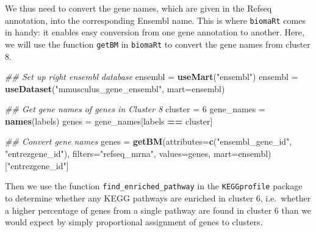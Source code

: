 \documentclass[9pt,a4paper,]{extarticle}
\newenvironment{Shaded}{\begin{snugshade}}{\end{snugshade}}
\newcommand{\CommentTok}[1]{\textcolor[rgb]{0.56,0.35,0.01}{\textit{#1}}}
\newcommand{\DataTypeTok}[1]{\textcolor[rgb]{0.13,0.29,0.53}{#1}}
\newcommand{\DecValTok}[1]{\textcolor[rgb]{0.00,0.00,0.81}{#1}}
\newcommand{\KeywordTok}[1]{\textcolor[rgb]{0.13,0.29,0.53}{\textbf{#1}}}
\newcommand{\NormalTok}[1]{#1}
\newcommand{\OperatorTok}[1]{\textcolor[rgb]{0.81,0.36,0.00}{\textbf{#1}}}
\newcommand{\OtherTok}[1]{\textcolor[rgb]{0.56,0.35,0.01}{#1}}
\newcommand{\StringTok}[1]{\textcolor[rgb]{0.31,0.60,0.02}{#1}}
\begin{document}
We thus need to convert the gene names, which are given in the Refseq
annotation, into the corresponding Ensembl name. This is where \texttt{biomaRt} comes
in handy: it enables easy conversion from one gene annotation to another.
Here, we will use the function \texttt{getBM} in \texttt{biomaRt} to convert the gene names
from cluster 8.

\begin{Shaded}
\begin{Highlighting}[]
\CommentTok{## Set up right ensembl database}
\NormalTok{ensembl =}\StringTok{ }\KeywordTok{useMart}\NormalTok{(}\StringTok{"ensembl"}\NormalTok{)}
\NormalTok{ensembl =}\StringTok{ }\KeywordTok{useDataset}\NormalTok{(}\StringTok{"mmusculus_gene_ensembl"}\NormalTok{, }\DataTypeTok{mart=}\NormalTok{ensembl)}

\CommentTok{## Get gene names of genes in Cluster 8}
\NormalTok{cluster =}\StringTok{ }\DecValTok{6}
\NormalTok{gene_names =}\StringTok{ }\KeywordTok{names}\NormalTok{(labels)}
\NormalTok{genes =}\StringTok{ }\NormalTok{gene_names[labels }\OperatorTok{==}\StringTok{ }\NormalTok{cluster]}

\CommentTok{## Convert gene names}
\NormalTok{genes =}\StringTok{ }\KeywordTok{getBM}\NormalTok{(}\DataTypeTok{attributes=}\KeywordTok{c}\NormalTok{(}\StringTok{"ensembl_gene_id"}\NormalTok{, }\StringTok{"entrezgene_id"}\NormalTok{),}
          \DataTypeTok{filters=}\StringTok{"refseq_mrna"}\NormalTok{, }\DataTypeTok{values=}\NormalTok{genes,}
          \DataTypeTok{mart=}\NormalTok{ensembl)[}\StringTok{"entrezgene_id"}\NormalTok{]}
\end{Highlighting}
\end{Shaded}

Then we use the function \texttt{find\_enriched\_pathway} in the \texttt{KEGGprofile} package
to determine whether any KEGG pathways are enriched in cluster 6, i.e.~whether
a higher percentage of genes from a single pathway are found in cluster 6 than
we would expect by simply proportional assignment of genes to clusters.

\begin{Shaded}
\end{Shaded}
\end{document}
